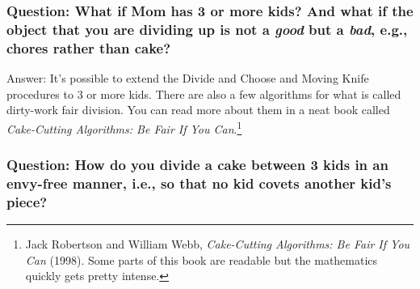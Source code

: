 \begin{comment}
\medskip

\noindent Another answer: You can also generalize the Divide and Choose algorithm\index{cake-cutting algorithms!Divide and Choose} to get what's called the Successive Pairs\index{cake-cutting algorithms!Successive Pairs} algorithm. It's a little complicated, but here's how it works with three kids: Have two of the kids play Divide and Choose, so that each of them gets at least 50\% of the cake. Then have each of those kids divide their part into three pieces, and have the third kid choose one piece from each of those. The cake will thus have been cut into six pieces, and each kid will end up with two. (Exercise: Can you convince yourself---or someone else---that each kid will get at least 33\% of the cake in his or her estimation?)

Which of these solutions is better? Well, that depends on your goal. Amusingly, mathematicians concern themselves with how to fairly divide the cake with the \emph{minimum} number of cuts. This leads (like many questions mathematical) into an amazingly connected realm of results about mathematical topics such as Ramsey partitions and graph theory.
\end{comment}


\subsubsection{Question: \rm What if Mom has 3 or more kids? And what if the object that you are dividing up is not a \textit{good} but a \textit{bad}, e.g., chores rather than cake?}

Answer: It's possible to extend the Divide and Choose and Moving Knife procedures to 3 or more kids. There are also a few algorithms for what is called dirty-work fair division. You can read more about them in a neat book called \textit{Cake-Cutting Algorithms: Be Fair If You Can}.\footnote{Jack Robertson and William Webb, \textit{Cake-Cutting Algorithms: Be Fair If You Can} (1998). Some parts of this book are readable but the mathematics quickly gets pretty intense.}



\subsubsection{Question: \rm How do you divide a cake between 3 kids in an \textbf{envy-free} manner, i.e., so that no kid covets another kid's piece?}

